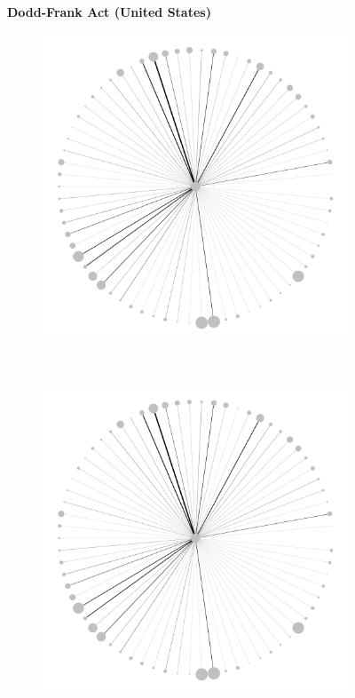 \documentclass[varwidth, border=0pt]{standalone}
\begin{document}
	
	\begin{figure}
	\centering
	\caption*{\textbf{Dodd-Frank Act (United States)}}
	\caption*{\textbf{\sffamily(a)}\quad Reliance}
\vspace*{-2pt}\begin{subfigure}{0.24\linewidth}
	\centering
	\includegraphics[width=\linewidth]{../../graphics/evolution/reliance-us-dodd-frank-2010.pdf}%
\end{subfigure}~%
\begin{subfigure}{0.24\linewidth}
	\centering
	\includegraphics[width=\linewidth]{../../graphics/evolution/reliance-us-dodd-frank-2013.pdf}%

\end{subfigure}
\end{figure}
\end{document}
